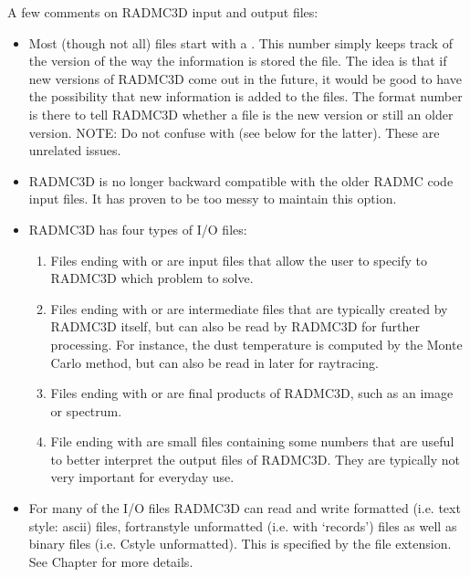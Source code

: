 \documentclass[letterpaper,10pt,english]{sphinxmanual}
\begin{document}
A few comments on RADMC\sphinxhyphen{}3D input and output files:
\begin{itemize}
\item {} 
Most (though not all) files start with a . This number simply
keeps track of the version of the way the information is stored the file. The
idea is that if new versions of RADMC\sphinxhyphen{}3D come out in the future, it would be
good to have the possibility that new information is added to the files. The
format number is there to tell RADMC\sphinxhyphen{}3D whether a file is the new version or
still an older version. NOTE: Do not confuse  with
 (see below for the latter). These are unrelated
issues.

\item {} 
RADMC\sphinxhyphen{}3D is no longer backward compatible with the older RADMC code input
files. It has proven to be too messy to maintain this option.

\item {} 
RADMC\sphinxhyphen{}3D has four types of I/O files:
\begin{enumerate}
%
\item {} 
Files ending with  or  are input files that
allow the user to specify to RADMC\sphinxhyphen{}3D which problem to solve.

\item {} 
Files ending with  or are intermediate
files that are typically created by RADMC\sphinxhyphen{}3D itself, but can also be read
by RADMC\sphinxhyphen{}3D for further processing. For instance, the dust temperature is
computed by the Monte Carlo method, but can also be read in later for
ray\sphinxhyphen{}tracing.

\item {} 
Files ending with  or  are final products of
RADMC\sphinxhyphen{}3D, such as an image or spectrum.

\item {} 
File ending with  are small files containing some numbers that are
useful to better interpret the output files of RADMC\sphinxhyphen{}3D. They are typically
not very important for every\sphinxhyphen{}day use.

\end{enumerate}

\item {} 
For many of the I/O files RADMC\sphinxhyphen{}3D can read and write formatted (i.e. text
style: ascii) files, fortran\sphinxhyphen{}style unformatted (i.e. with ‘records’) files as
well as binary files (i.e. C\sphinxhyphen{}style unformatted). This is specified by the file
extension. See Chapter {\hyperref[\detokenize{binaryio:chap-binary-io}]{}} for more details.

\end{itemize}
\end{document}
